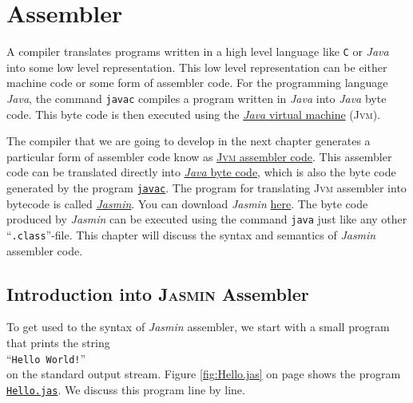 \chapter{Assembler}
A compiler translates programs written in a high level language like \texttt{C} or
\textsl{Java} into some low level representation.  This low level representation can be
either machine code or some form of assembler code.  For the programming language \textsl{Java},
the command \texttt{javac} compiles a program written in \textsl{Java} into
\textsl{Java} byte code.  This byte code is then executed using the 
\href{http://en.wikipedia.org/wiki/Java_virtual_machine}{\textsl{Java} virtual machine}
(\textsc{Jvm}).

The compiler that we are going to
develop in the next chapter generates a particular form of assembler code know as
\href{http://jasmin.sourceforge.net}{\textsc{Jvm} assembler code}.
This assembler code can be translated directly into
\href{http://en.wikipedia.org/wiki/Java_bytecode}{\textsl{Java} byte code}, which 
is also the byte code generated by the program \href{https://en.wikipedia.org/wiki/javac}{\texttt{javac}}.  The
program for translating \textsc{Jvm} 
assembler into bytecode is called \href{http://jasmin.sourceforge.net}{\textsl{Jasmin}}.
You can download \textsl{Jasmin} 
\href{http://sourceforge.net/projects/jasmin/files/latest/download?source=files}{here}.
The  byte code produced by \textsl{Jasmin} can be executed using the
command  \texttt{java} just like any other ``\texttt{.class}''-file.  
This chapter will discuss the syntax and semantics of \textsl{Jasmin} assembler code.



\section{Introduction into \textsc{Jasmin} Assembler}
To get used to the syntax of \textsl{Jasmin} assembler, we start with a small program that prints the
string 
\\[0.2cm]
\hspace*{1.3cm}
``\texttt{Hello World!}'' 
\\[0.2cm]
on the standard output stream.  Figure \ref{fig:Hello.jas} on page
\pageref{fig:Hello.jas} shows the program
\href{https://github.com/karlstroetmann/Formal-Languages/tree/master/Jasmin/Hello.jas}{\texttt{Hello.jas}}. 
We discuss this program line by line.

